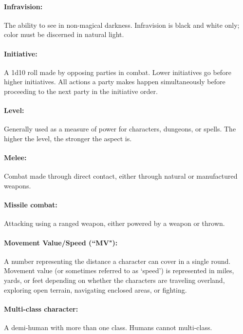 \begin{multicols}{2}
\paragraph{Infravision:} The ability to see in non-magical darkness.  Infravision is black and white only; color must be discerned in natural light.

\paragraph{Initiative:} A 1d10 roll made by opposing parties in combat.  Lower initiatives go before higher initiatives.  All actions a party makes happen simultaneously before proceeding to the next party in the initiative order.

\paragraph{Level:} Generally used as a measure of power for characters, dungeons, or spells.  The higher the level, the stronger the aspect is.

\paragraph{Melee:} Combat made through direct contact, either through natural or manufactured weapons.

\paragraph{Missile combat:} Attacking using a ranged weapon, either powered by a weapon or thrown.

\paragraph{Movement Value/Speed (``MV"):} A number representing the distance a character can cover in a single round.  Movement value (or sometimes referred to as ‘speed') is represented in miles, yards, or feet depending on whether the characters are traveling overland, exploring open terrain, navigating enclosed areas, or fighting.

\paragraph{Multi-class character:} A demi-human with more than one class.  Humans cannot multi-class.


\end{multicols}
